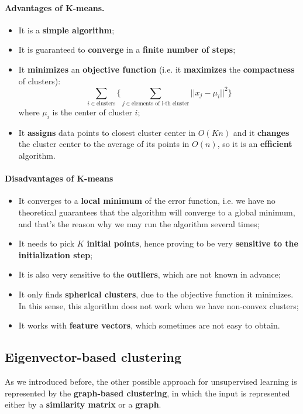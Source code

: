 \paragraph*{Advantages of K-means.} 
\begin{itemize}
        \item It is a \textbf{simple algorithm};
	\item It is guaranteed to \textbf{converge} in a \textbf{finite number of steps};
	\item It \textbf{minimizes} an \textbf{objective function} (i.e. it \textbf{maximizes} the \textbf{compactness} of clusters):
	$$\sum_{i \in \text{clusters}} \Biggl\{ \sum_{j \in \text{elements of i-th cluster}} ||x_j - \mu_i||^2 \Biggr\}$$
	where $\mu_i$ is the center of cluster $i$;
	\item It \textbf{assigns} data points to closest cluster center in $O(Kn)$ and it \textbf{changes} the cluster center to the average of its points in $O(n)$, so it is an \textbf{efficient} algorithm.
\end{itemize}

\paragraph{Disadvantages of K-means}

\begin{itemize}
    \item It converges to a \textbf{local minimum} of the error function, i.e. we have no theoretical guarantees that the algorithm will converge to a global minimum, and that's the reason why we may run the algorithm several times;
    \item It needs to pick $K$ \textbf{initial points}, hence proving to be very \textbf{sensitive to the initialization step};
    \item It is also very sensitive to the \textbf{outliers}, which are not known in advance;
    \item It only finds \textbf{spherical clusters}, due to the objective function it minimizes. In this sense, this algorithm does not work when we have non-convex clusters;
    \item It works with \textbf{feature vectors}, which sometimes are not easy to obtain.
\end{itemize}

\subsection{Eigenvector-based clustering}
As we introduced before, the other possible approach for unsupervised learning is represented by the \textbf{graph-based clustering}, in which the input is represented either by a \textbf{similarity matrix} or a \textbf{graph}.

